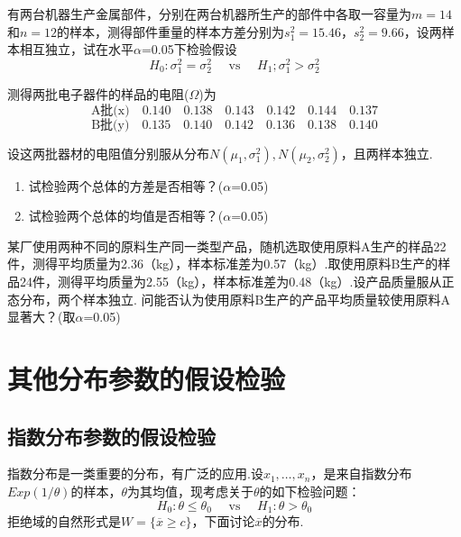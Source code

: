 \begin{xiti}
	
	\item 有两台机器生产金属部件，分别在两台机器所生产的部件中各取一容量为$m=14$和$n=12$的样本，测得部件重量的样本方差分别为$s_{1}^{2}=15.46，s_{2}^{2}=9.66$，设两样本相互独立，试在水平$\alpha$=0.05下检验假设
	\[H _ { 0 } : \sigma _ { 1 } ^ { 2 } = \sigma _ { 2 } ^ { 2 } \quad \text { vs } \quad H _ { 1 } ; \sigma _ { 1 } ^ { 2 } > \sigma _ { 2 } ^ { 2 }\]
	
	
	\item 测得两批电子器件的样品的电阻($ \Omega$)为
	\[\text{A批(x)}\quad0.140 \quad 0.138 \quad 0.143 \quad 0.142 \quad 0.144 \quad 0.137\]
	\[\text{B批(y)}\quad0.135 \quad 0.140 \quad 0.142 \quad 0.136 \quad 0.138 \quad 0.140\]

	设这两批器材的电阻值分别服从分布$N \left( \mu _ { 1 } , \sigma _ { 1 } ^ { 2 } \right) , N \left( \mu _ { 2 } , \sigma _ { 2 } ^ { 2 } \right)$，且两样本独立.
	\begin{enumerate}
		\item 试检验两个总体的方差是否相等？($\alpha$=0.05)
		\item 试检验两个总体的均值是否相等？($\alpha$=0.05)
	\end{enumerate}
	
	\item 某厂使用两种不同的原料生产同一类型产品，随机选取使用原料A生产的样品22件，测得平均质量为2.36（kg），样本标准差为0.57（kg）.取使用原料B生产的样品24件，测得平均质量为2.55（kg），样本标准差为0.48（kg）.设产品质量服从正态分布，两个样本独立.
	问能否认为使用原料B生产的产品平均质量较使用原料A显著大？(取$\alpha$=0.05)
\end{xiti}


\section{其他分布参数的假设检验}\label{sec:7.3}
\subsection{指数分布参数的假设检验}\label{sec:7.3.1}
指数分布是一类重要的分布，有广泛的应用.设$x_{1},\dotsc,x_{n}$，是来自指数分布$Exp(1/\theta)$的样本，$\theta$为其均值，现考虑关于$\theta$的如下检验问题：
\begin{equation}\label{eq7.3.1}
H _ { 0 } : \theta \leq \theta _ { 0 } \quad \text { vs } \quad H _ { 1 } : \theta > \theta _ { 0 }
\end{equation}
拒绝域的自然形式是$W = \{ \overline { x } \geq c \}$，下面讨论$\overline{ x }$的分布.

